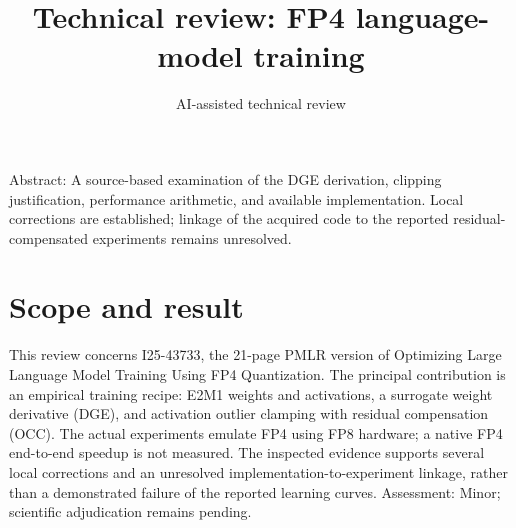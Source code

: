 \documentclass[10pt]{article}
\title{Technical review: FP4 language-model training}
\author{AI-assisted technical review}
\date{}
\begin{document}
\maketitle
Abstract: A source-based examination of the DGE derivation, clipping justification, performance arithmetic, and available implementation. Local corrections are established; linkage of the acquired code to the reported residual-compensated experiments remains unresolved.\par
\section*{Scope and result}
This review concerns I25-43733, the 21-page PMLR version of Optimizing Large Language Model Training Using FP4 Quantization. The principal contribution is an empirical training recipe: E2M1 weights and activations, a surrogate weight derivative (DGE), and activation outlier clamping with residual compensation (OCC). The actual experiments emulate FP4 using FP8 hardware; a native FP4 end-to-end speedup is not measured. The inspected evidence supports several local corrections and an unresolved implementation-to-experiment linkage, rather than a demonstrated failure of the reported learning curves. Assessment: Minor; scientific adjudication remains pending.\par
\end{document}

